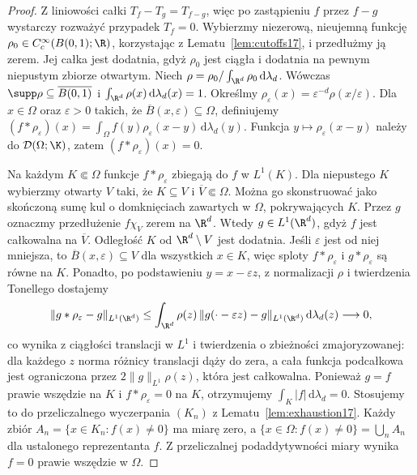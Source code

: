 \begin{proof}
Z liniowości całki $T_f-T_g=T_{f-g}$, więc po zastąpieniu
$f$ przez $f-g$ wystarczy rozważyć przypadek $T_f=0$.
Wybierzmy niezerową, nieujemną funkcję
$\rho_0\in C_c^\infty(B(0,1);\R)$, korzystając
z Lematu~\ref{lem:cutoffs17}, i przedłużmy ją zerem.
Jej całka jest dodatnia, gdyż $\rho_0$ jest ciągła
i dodatnia na pewnym niepustym zbiorze otwartym.
Niech $\rho=\rho_0/\int_{\R^d}\rho_0\,\mathrm d\lambda_d$.
Wówczas $\supp\rho\subseteq\overline{B(0,1)}$ i
$\int_{\R^d}\rho(x)\,\mathrm d\lambda_d(x)=1$. Określmy
$\rho_\varepsilon(x)=\varepsilon^{-d}\rho(x/\varepsilon)$.
Dla $x\in\Omega$ oraz $\varepsilon>0$ takich, że
$\overline B(x,\varepsilon)\subseteq\Omega$, definiujemy
$(f*\rho_\varepsilon)(x)=\int_\Omega f(y)\rho_\varepsilon(x-y)
\,\mathrm d\lambda_d(y)$.
Funkcja $y\mapsto\rho_\varepsilon(x-y)$ należy do
$\mathcal D(\Omega;\K)$, zatem
$(f*\rho_\varepsilon)(x)=0$.

Na każdym $K\Subset\Omega$ funkcje
$f*\rho_\varepsilon$ zbiegają do $f$ w $L^1(K)$.
Dla niepustego $K$ wybierzmy otwarty $V$ taki, że
$K\subseteq V$ i $\overline V\Subset\Omega$.
Można go skonstruować jako skończoną sumę kul o domknięciach
zawartych w $\Omega$, pokrywających $K$.
Przez $g$ oznaczmy przedłużenie $f\chi_V$ zerem na $\R^d$.
Wtedy $g\in L^1(\R^d)$, gdyż $f$ jest całkowalna na
$\overline V$. Odległość $K$ od $\R^d\setminus V$ jest dodatnia.
Jeśli $\varepsilon$ jest od niej mniejsza, to
$\overline B(x,\varepsilon)\subseteq V$ dla wszystkich $x\in K$,
więc sploty $f*\rho_\varepsilon$ i $g*\rho_\varepsilon$
są równe na $K$. Ponadto, po podstawieniu $y=x-\varepsilon z$,
z normalizacji $\rho$ i twierdzenia Tonellego dostajemy
\[\|g*\rho_\varepsilon-g\|_{L^1(\R^d)}\le
\int_{\R^d}\rho(z)\,
\|g(\cdot-\varepsilon z)-g\|_{L^1(\R^d)}\,
\mathrm d\lambda_d(z)\longrightarrow0,\]
co wynika z ciągłości translacji w $L^1$ i twierdzenia
o zbieżności zmajoryzowanej: dla każdego $z$
norma różnicy translacji dąży do zera, a cała funkcja
podcałkowa jest ograniczona przez
$2\|g\|_{L^1}\rho(z)$, która jest całkowalna.
Ponieważ $g=f$ prawie wszędzie na $K$ i
$f*\rho_\varepsilon=0$ na $K$, otrzymujemy
$\int_K|f|\,\mathrm d\lambda_d=0$.
Stosujemy to do przeliczalnego wyczerpania $(K_n)$
z Lematu~\ref{lem:exhaustion17}. Każdy zbiór
$A_n=\{x\in K_n:f(x)\ne0\}$ ma miarę zero,
a $\{x\in\Omega:f(x)\ne0\}=\bigcup_n A_n$ dla ustalonego
reprezentanta $f$. Z przeliczalnej podaddytywności miary
wynika $f=0$ prawie wszędzie w $\Omega$.
\end{proof}

